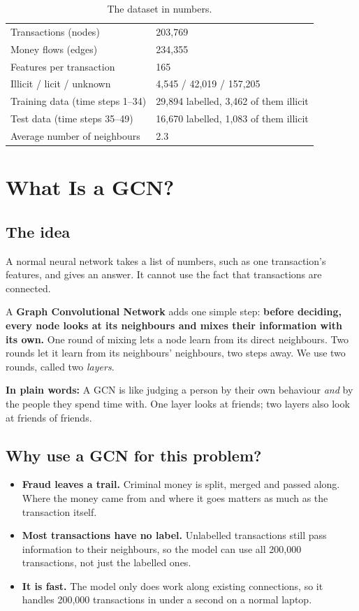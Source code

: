 \documentclass[11pt,a4paper]{article}
\newcommand{\plain}[1]{\par\noindent\colorbox{notebg}{\parbox{\dimexpr\linewidth-2\fboxsep}{\small\textbf{In plain words:} #1}}\par}
\begin{document}
\begin{table}[H]
\centering\small
\begin{tabular}{ll}
\toprule
Transactions (nodes) & 203,769 \\
Money flows (edges) & 234,355 \\
Features per transaction & 165 \\
Illicit / licit / unknown & 4,545 / 42,019 / 157,205 \\
Training data (time steps 1--34) & 29,894 labelled, 3,462 of them illicit \\
Test data (time steps 35--49) & 16,670 labelled, 1,083 of them illicit \\
Average number of neighbours & 2.3 \\
\bottomrule
\end{tabular}
\caption{The dataset in numbers.}
\label{tab:data}
\end{table}

\section{What Is a GCN?}
\subsection{The idea}
A normal neural network takes a list of numbers, such as one transaction's features, and gives an answer. It cannot use
the fact that transactions are connected.

A \textbf{Graph Convolutional Network} adds one simple step: \textbf{before deciding, every node looks at its neighbours and
mixes their information with its own.} One round of mixing lets a node learn from its direct neighbours. Two rounds let it
learn from its neighbours' neighbours, two steps away. We use two rounds, called two \emph{layers}.

\plain{A GCN is like judging a person by their own behaviour \emph{and} by the people they spend time with. One layer looks at
friends; two layers also look at friends of friends.}

\subsection{Why use a GCN for this problem?}
\begin{itemize}
  \item \textbf{Fraud leaves a trail.} Criminal money is split, merged and passed along. Where the money came from and where it goes
        matters as much as the transaction itself.
  \item \textbf{Most transactions have no label.} Unlabelled transactions still pass information to their neighbours, so the
        model can use all 200,000 transactions, not just the labelled ones.
  \item \textbf{It is fast.} The model only does work along existing connections, so it handles 200,000 transactions in under a
        second on a normal laptop.
\end{itemize}
\end{document}
